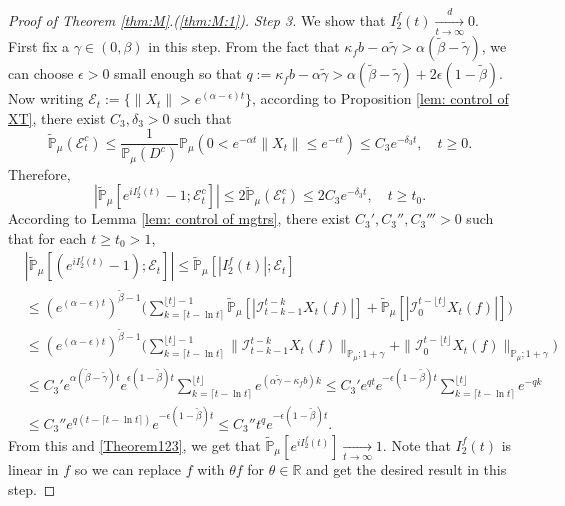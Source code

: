 \documentclass[EJP]{ejpecp} %
\begin{document}
\begin{proof}[Proof of Theorem \ref{thm:M}.(\ref{thm:M:1})]
	\emph{Step 3.} We show that $I^f_2(t)\xrightarrow[t\to \infty]{d} 0$.
  	First fix a $\gamma \in (0,\beta)$ in this step.
  	From the fact that $\kappa_f b -\alpha \tilde \gamma > \alpha (\tilde \beta - \tilde \gamma)$, we can choose $\epsilon >0$ small enough so that $q:=\kappa_fb- \alpha \tilde \gamma  > \alpha (\tilde \beta - \tilde \gamma) + 2\epsilon (1 - \tilde \beta)$.
  	Now writing $\mathcal{E}_t:=\{\|X_t\|>e^{(\alpha-\epsilon) t}\}$, according to Proposition \ref{lem: control of XT}, there exist $C_3, \delta_3>0$ such that
\[
    \mathbb{\widetilde{P}}_{\mu}(\mathcal{E}^c_t)
    \leq \frac{1}{\mathbb{P}_{\mu}(D^c)}\mathbb{P}_{\mu}(0<e^{-\alpha t}\|X_t\|\leq e^{-\epsilon t})\leq C_3e^{-\delta_3 t}, 
    \quad t\geq0.
\]
  	Therefore,
\begin{equation}
\label{Theorem123}
    |\mathbb{\widetilde{P}}_{\mu}[e^{i I^f_2(t)}-1;\mathcal{E}^c_t]|
    \leq 2\mathbb{\widetilde{P}}_{\mu}(\mathcal{E}^c_t)
    \leq 2C_3e^{-\delta_3 t},
    \quad t\geq t_0.
\end{equation}
	According to Lemma \ref{lem: control of mgtrs}, there exist $C_3',C_3'',C_3'''>0$ such that for each $t\geq t_0 >1$,
\begin{align}
    & |\mathbb{\widetilde{P}}_{\mu} [ (e^{i I^f_2(t)}-1);\mathcal{E}_t]|
   	\leq  \mathbb{\widetilde{P}}_{\mu} [ |I^f_2(t)|;\mathcal{E}_t] \\
    & \leq  ( e^{(\alpha-\epsilon) t} )^{\tilde \beta - 1}\Big(\sum_{k=\lceil t-\ln t \rceil}^{\lfloor t \rfloor - 1}\mathbb{\widetilde{P}}_{\mu} [| \mathcal{I}_{t-k-1}^{t-k} X_t(f) |] + \mathbb{\widetilde{P}}_{\mu}[| \mathcal{I}_{0}^{t-\lfloor t\rfloor} X_t(f)|]\Big) \\
    & \leq ( e^{(\alpha-\epsilon) t} )^{\tilde \beta - 1}\Big(\sum_{k=\lceil t-\ln t \rceil}^{\lfloor t \rfloor - 1}\|\mathcal{I}_{t-k-1}^{t-k} X_t(f) \|_{\mathbb P_\mu; 1+\gamma} + \|\mathcal I_0^{t-\lfloor t \rfloor} X_t(f)\|_{\mathbb P_\mu;1+\gamma}\Big) \\
    & \leq C_3' e^{\alpha (\tilde \beta - \tilde \gamma)t} e ^{\epsilon (1-\tilde \beta) t}\sum_{k=\lceil t-\ln t \rceil}^{\lfloor t \rfloor}  e^{(\alpha\tilde \gamma-\kappa_f b)k}
   	\leq C_3' e^{q t}e^{-\epsilon ( 1 - \tilde \beta)t}\sum_{k=\lceil t-\ln t \rceil}^{\lfloor t \rfloor}  e^{-q k}
    \\ & \leq C_3'' e^{q(t - \lceil t - \ln t\rceil)}e^{-\epsilon(1 - \tilde \beta) t}
 	\leq C_3'' t^q e^{- \epsilon(1 - \tilde \beta) t}.
\end{align}
	From this and \eqref{Theorem123}, we get that $\widetilde {\mathbb P}_\mu[e^{i I^f_2(t)}] \xrightarrow[t\to \infty]{} 1$.
	Note that $I^f_2(t)$ is linear in $f$ so we can replace $f$ with $\theta f$ for $\theta \in \mathbb R$ and get the desired result in this step.


\end{proof}
\end{document}
